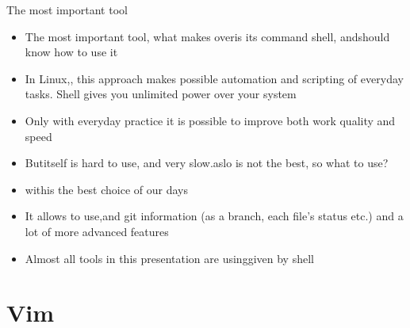 \documentclass[usenames,dvipsnames,10pt,aspectratio=169]{beamer}
\begin{document}
\begin{frame}{The most important tool}
    \begin{itemize}
        \item The most important tool, what makes overis its command shell, andshould know how to use it
        \item In Linux,, this approach makes possible automation and scripting of everyday tasks. Shell gives you unlimited power over your system
        \item Only with everyday practice it is possible to improve both work quality and speed
        \item Butitself is hard to use, and very slow.aslo is not the best, so what to use?
        \item{}withis the best choice of our days
        \item It allows to use,and git information (as a branch, each file's status etc.) and a lot of more advanced features
        \item Almost all tools in this presentation are usinggiven by shell
    \end{itemize}
\end{frame}

\section{Vim}
\end{document}

